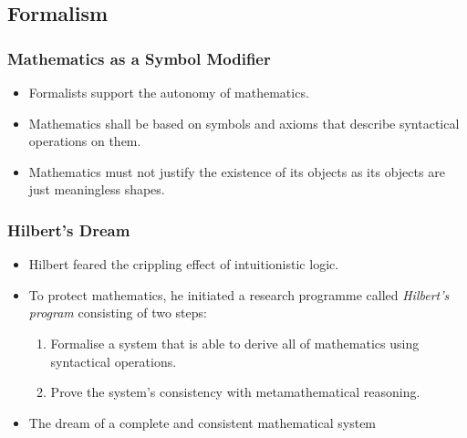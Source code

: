 \documentclass{beamer}
\begin{document}
\subsection{Formalism}
\begin{frame}
    \frametitle{Mathematics as a Symbol Modifier}
    \begin{itemize}[<+->]
	\item Formalists support the autonomy of mathematics.
	\item Mathematics shall be based on symbols and axioms that describe syntactical operations on them.
	\item Mathematics must not justify the existence of its objects as its objects are just meaningless shapes.
    \end{itemize}
\end{frame}
\begin{frame}
    \frametitle{Hilbert's Dream}
    \begin{itemize}[<+->]
	\item Hilbert feared the crippling effect of intuitionistic logic.
	\item To protect mathematics, he initiated a research programme called \textit{Hilbert's program} consisting of two steps:
	\begin{enumerate}
		\item Formalise a system that is able to derive all of mathematics using syntactical operations.
		\item Prove the system's consistency with metamathematical reasoning.
	\end{enumerate}
	\item The dream of a complete and consistent mathematical system
    \end{itemize}
\end{frame}
\end{document}

